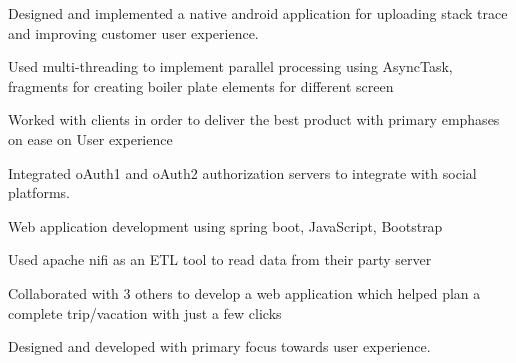 \documentclass[]{deedy-resume-openfont}
\begin{document}
\begin{minipage}[t]{0.66\textwidth}
\begin{tightemize}
\item  Designed and implemented a native android application for uploading stack
trace and improving customer user experience.
\item Used multi-threading to implement parallel processing using AsyncTask,
fragments for creating boiler plate elements for different screen
\item Worked with clients in order to deliver the best product with primary emphases on ease on User experience
\item Integrated oAuth1 and oAuth2 authorization servers to integrate with social platforms.
\end{tightemize}
\sectionsep

\begin{tightemize}
\item Web application development using spring boot, JavaScript, Bootstrap
\item Used apache nifi as an ETL tool to read data from their party server
\end{tightemize}
\sectionsep

\begin{tightemize}
\item Collaborated with 3 others to develop a web application which helped plan a
complete trip/vacation with just a few clicks
\item Designed and developed with primary focus towards user experience.
\end{tightemize}
\sectionsep




\end{minipage} 
\end{document}
